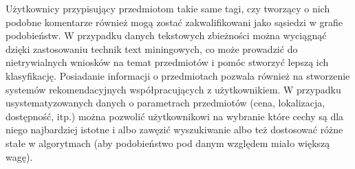 \documentclass{pracamgr}
\begin{document}
   Użytkownicy przypisujący przedmiotom takie same tagi, czy tworzący o
   nich podobne komentarze również mogą zostać zakwalifikowani jako sąsiedzi w grafie podobieństw.
   W przypadku danych tekstowych zbieżności można wyciągnąć dzięki zastosowaniu technik text miningowych,
   co może prowadzić do nietrywialnych wniosków na temat przedmiotów i pomóc stworzyć lepszą ich klasyfikację.\newline
   Posiadanie informacji o przedmiotach pozwala również na stworzenie systemów rekomendacyjnych współpracujących z użytkownikiem.
   W przypadku usystematyzowanych danych o parametrach przedmiotów (cena, lokalizacja, dostępność, itp.)
   można pozwolić użytkownikowi na wybranie które cechy są dla niego najbardziej istotne i albo zawęzić wyszukiwanie albo też
   dostosować różne stałe w algorytmach (aby podobieństwo pod danym względem miało większą wagę).
   
   
   
\begin{thebibliography}{99}%






\end{thebibliography}
\end{document}
